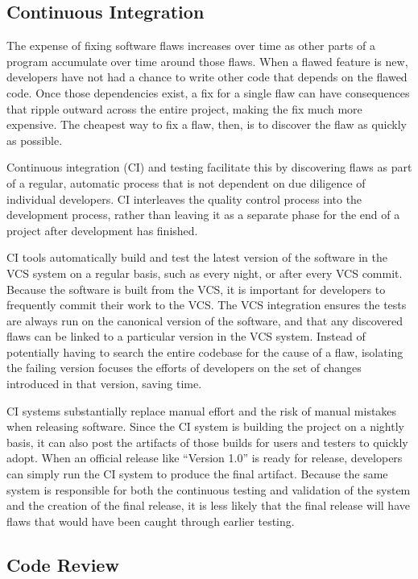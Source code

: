 \subsection{Continuous Integration}

The expense of fixing software flaws increases over time as other
parts of a program accumulate over time around those flaws. When a
flawed feature is new, developers have not had a chance to write other
code that depends on the flawed code. Once those dependencies exist, a
fix for a single flaw can have consequences that ripple outward across
the entire project, making the fix much more expensive. The cheapest
way to fix a flaw, then, is to discover the flaw as quickly as
possible.

Continuous integration (CI) and testing facilitate this by discovering
flaws as part of a regular, automatic process that is not dependent on
due diligence of individual developers. CI interleaves the quality
control process into the development process, rather than leaving it
as a separate phase for the end of a project after development has
finished.

CI tools automatically build and test the latest version of the
software in the VCS system on a regular basis, such as every night, or
after every VCS commit. Because the software is built from the VCS, it
is important for developers to frequently commit their work to the
VCS. The VCS integration ensures the tests are always run on the
canonical version of the software, and that any discovered flaws can
be linked to a particular version in the VCS system. Instead of
potentially having to search the entire codebase for the cause of a
flaw, isolating the failing version focuses the efforts of developers
on the set of changes introduced in that version, saving time.

CI systems substantially replace manual effort and the risk of manual
mistakes when releasing software. Since the CI system is building the
project on a nightly basis, it can also post the artifacts of those
builds for users and testers to quickly adopt. When an official
release like ``Version 1.0'' is ready for release, developers can
simply run the CI system to produce the final artifact. Because the
same system is responsible for both the continuous testing and
validation of the system and the creation of the final release, it is
less likely that the final release will have flaws that would have
been caught through earlier testing.

\subsection{Code Review}

